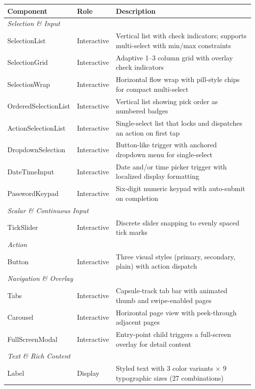 \documentclass{llmxive}
\begin{document}
\begin{table}[!htbp]
\centering

\small
\begin{tabular}{llp{7.2cm}}
\toprule
\textbf{Component} & \textbf{Role} & \textbf{Description} \\
\midrule
\multicolumn{3}{l}{\textit{Selection \& Input}} \\
SelectionList & Interactive & Vertical list with check indicators; supports multi-select with min/max constraints \\
SelectionGrid & Interactive & Adaptive 1--3 column grid with overlay check indicators \\
SelectionWrap & Interactive & Horizontal flow wrap with pill-style chips for compact multi-select \\
OrderedSelectionList & Interactive & Vertical list showing pick order as numbered badges \\
ActionSelectionList & Interactive & Single-select list that locks and dispatches an action on first tap \\
DropdownSelection & Interactive & Button-like trigger with anchored dropdown menu for single-select \\
DateTimeInput & Interactive & Date and/or time picker trigger with localized display formatting \\
PasswordKeypad & Interactive & Six-digit numeric keypad with auto-submit on completion \\
\midrule
\multicolumn{3}{l}{\textit{Scalar \& Continuous Input}} \\
TickSlider & Interactive & Discrete slider snapping to evenly spaced tick marks \\
\midrule
\multicolumn{3}{l}{\textit{Action}} \\
Button & Interactive & Three visual styles (primary, secondary, plain) with action dispatch \\
\midrule
\multicolumn{3}{l}{\textit{Navigation \& Overlay}} \\
Tabs & Interactive & Capsule-track tab bar with animated thumb and swipe-enabled pages \\
Carousel & Interactive & Horizontal page view with peek-through adjacent pages \\
FullScreenModal & Interactive & Entry-point child triggers a full-screen overlay for detail content \\
\midrule
\multicolumn{3}{l}{\textit{Text \& Rich Content}} \\
Label & Display & Styled text with 3 color variants $\times$ 9 typographic sizes (27 combinations) \\

\end{tabular}
\end{table}
\end{document}
